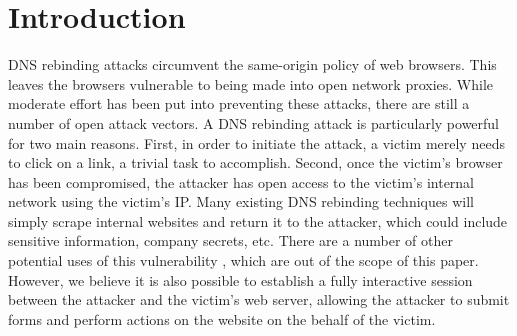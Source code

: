 \section{Introduction}
\label{sec:intro}

DNS rebinding attacks circumvent the same-origin policy of web browsers. This leaves the browsers vulnerable to being made into open network proxies. While moderate effort has been put into preventing these attacks, there are still a number of open attack vectors. A DNS rebinding attack is particularly powerful for two main reasons. First, in order to initiate the attack, a victim merely needs to click on a link, a trivial task to accomplish. Second, once the victim's browser has been compromised, the attacker has open access to the victim's internal network using the victim's IP. Many existing DNS rebinding techniques will simply scrape internal websites and return it to the attacker, which could include sensitive information, company secrets, etc. There are a number of other potential uses of this vulnerability \cite{protectFromDNS}, which are out of the scope of this paper. However, we believe it is also possible to establish a fully interactive session between the attacker and the victim's web server, allowing the attacker to submit forms and perform actions on the website on the behalf of the victim. 


